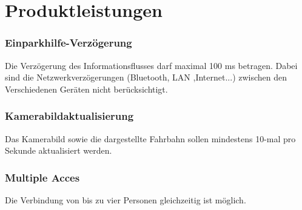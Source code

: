\documentclass[pflichtenheft.tex]{subfiles}
\begin{document}

\chapter{Produktleistungen}

\subsection{\mkl Einparkhilfe-Verzögerung}
Die Verzögerung des Informationsflusses darf maximal 100 ms betragen. Dabei sind die Netzwerkverzögerungen (Bluetooth, LAN ,Internet...) zwischen den Verschiedenen Geräten nicht berücksichtigt. 

\subsection{\mkl Kamerabildaktualisierung}
Das Kamerabild sowie die dargestellte Fahrbahn sollen mindestens 10-mal pro Sekunde aktualisiert werden.

\subsection{\mkl Multiple Acces} Die Verbindung von bis zu vier Personen gleichzeitig ist möglich.
\end{document}
